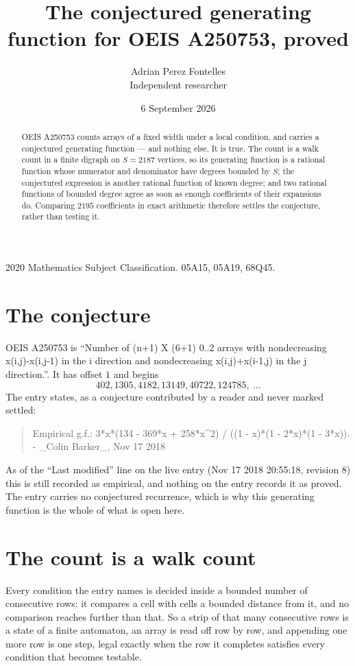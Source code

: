 \documentclass[11pt,a4paper]{article}
\title{The conjectured generating function for OEIS A250753, proved}
\author{Adrian Perez Fontelles\\ \small Independent researcher}
\date{6 September 2026}
\theoremstyle{plain}
\theoremstyle{definition}
\begin{document}
\maketitle

\begin{abstract}
OEIS A250753 counts arrays of a fixed width under a local condition, and carries a conjectured
generating function --- and nothing else. It is true. The count is a walk count in a finite
digraph on $S=2187$ vertices, so its generating function is a rational function whose numerator
and denominator have degrees bounded by $S$; the conjectured expression is another rational
function of known degree; and two rational functions of bounded degree agree as soon as enough
coefficients of their expansions do. Comparing $2195$ coefficients in exact arithmetic
therefore settles the conjecture, rather than testing it.
\end{abstract}

\noindent\small 2020 Mathematics Subject Classification. 05A15, 05A19, 68Q45.\normalsize

\section{The conjecture}

OEIS A250753 is ``Number of (n+1) X (6+1) 0..2 arrays with nondecreasing x(i,j)-x(i,j-1) in the i direction and nondecreasing x(i,j)+x(i-1,j) in the j direction.''. It has offset $1$ and begins
\[
402, 1305, 4182, 13149, 40722, 124785,\ \dots
\]
The entry states, as a conjecture contributed by a reader and never marked settled:
\begin{quote}
Empirical g.f.: 3*x*(134 - 369*x + 258*x\^{}2) / ((1 - x)*(1 - 2*x)*(1 - 3*x)). - \_Colin Barker\_, Nov 17 2018
\end{quote}
As of the ``Last modified'' line on the live entry (Nov 17 2018 20:55:18, revision 8) this is still
recorded as empirical, and nothing on the entry records it as proved. The entry carries no
conjectured recurrence, which is why this generating function is the whole of what is open
here.

\section{The count is a walk count}

Every condition the entry names is decided inside a bounded number of consecutive rows: it
compares a cell with cells a bounded distance from it, and no comparison reaches further than
that. So a strip of that many consecutive rows is a state of a finite automaton, an array is
read off row by row, and appending one more row is one step, legal exactly when the row it
completes satisfies every condition that becomes testable.
\end{document}
